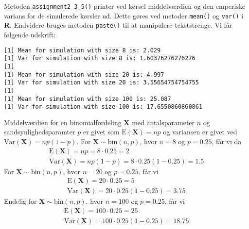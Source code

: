 {

Metoden \texttt{assignment2\_3\_5()} printer ved kørsel middelv\ae rdien og
den emperiske varians for de simulerede kørsler ud. Dette gøres ved
metoder \texttt{mean()} og \texttt{var()} i \textbf{R}. Endvidere bruges
metoden \texttt{paste()} til at manipulere tekststrenge. Vi får følgende
udskrift:

\begin{verbatim}
[1] Mean for simulation with size 8 is: 2.029
[1] Var for simulation with size 8 is: 1.60376276276276
[1]
[1] Mean for simulation with size 20 is: 4.997
[1] Var for simulation with size 20 is: 3.55654754754755
[1]
[1] Mean for simulation with size 100 is: 25.087
[1] Var for simulation with size 100 is: 17.6550860860861
\end{verbatim}

Middelværdien for en binomialfordeling $\mathbf{X}$ med antalsparameter $n$ og
sandsynlighedsparamter $p$ er givet som $\textrm{E}(\mathbf{X}) = np$ og
variansen er givet ved $\textrm{Var}(\mathbf{X}) = np(1 - p)$. For
$\mathbf{X} \sim{ \textrm{bin} \left( n,p \right) }$, hvor $n = 8$ og $p
= 0.25$,
får vi da
\begin{eqnarray}
    \textrm{E}(\mathbf{X}) = np = 8\cdot0.25 = 2 \\
    \textrm{Var}(\mathbf{X}) = np(1 - p) = 8\cdot0.25(1 - 0.25) = 1.5
\end{eqnarray}
For $\mathbf{X} \sim{ \textrm{bin} \left( n,p \right) }$, hvor $n = 20$
og $p = 0.25$, får vi
\begin{eqnarray}
    \textrm{E}(\mathbf{X}) = 20\cdot0.25 = 5 \\
    \textrm{Var}(\mathbf{X}) = 20\cdot0.25(1 - 0.25) = 3.75
\end{eqnarray}
Endelig for $\mathbf{X} \sim{ \textrm{bin} \left( n,p \right) }$, hvor $n
= 100$ og $p = 0.25$, får vi
\begin{eqnarray}
    \textrm{E}(\mathbf{X}) = 100\cdot 0.25 = 25 \\
    \textrm{Var}(\mathbf{X}) = 100\cdot0.25(1 - 0.25) = 18.75
\end{eqnarray}

}
